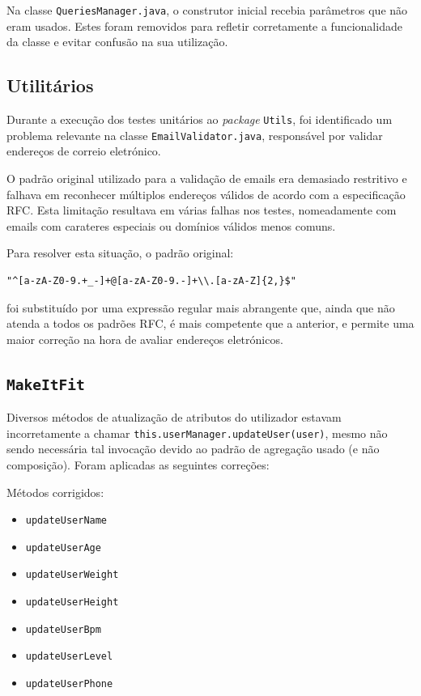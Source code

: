 \documentclass[12pt, a4paper]{article}
\begin{document}
Na classe \texttt{QueriesManager.java}, o construtor inicial recebia parâmetros
que não eram usados. Estes foram removidos para refletir corretamente a
funcionalidade da classe e evitar confusão na sua utilização.

\subsection{Utilitários}

Durante a execução dos testes unitários ao \emph{package} \texttt{Utils}, foi
identificado um problema relevante na classe \texttt{EmailValidator.java},
responsável por validar endereços de correio eletrónico.

O padrão original utilizado para a validação de emails era demasiado restritivo
e falhava em reconhecer múltiplos endereços válidos de acordo com a
especificação RFC. Esta limitação resultava em várias falhas nos testes,
nomeadamente com emails com carateres especiais ou domínios válidos menos comuns.

Para resolver esta situação, o padrão original:
\begin{verbatim}
"^[a-zA-Z0-9.+_-]+@[a-zA-Z0-9.-]+\\.[a-zA-Z]{2,}$"
\end{verbatim}
foi substituído por uma expressão regular mais abrangente que, ainda que não
atenda a todos os padrões RFC, é mais competente que a anterior, e permite
uma maior correção na hora de avaliar endereços eletrónicos.
\subsection{\texttt{MakeItFit}}

Diversos métodos de atualização de atributos do utilizador estavam incorretamente a chamar
\texttt{this.userManager.updateUser(user)}, mesmo não sendo necessária tal invocação devido ao
padrão de agregação usado (e não composição). Foram aplicadas as seguintes correções:

Métodos corrigidos:
\begin{itemize}
    \item \texttt{updateUserName}
    \item \texttt{updateUserAge}
    \item \texttt{updateUserWeight}
    \item \texttt{updateUserHeight}
    \item \texttt{updateUserBpm}
    \item \texttt{updateUserLevel}
    \item \texttt{updateUserPhone}
\end{itemize}
\end{document}
